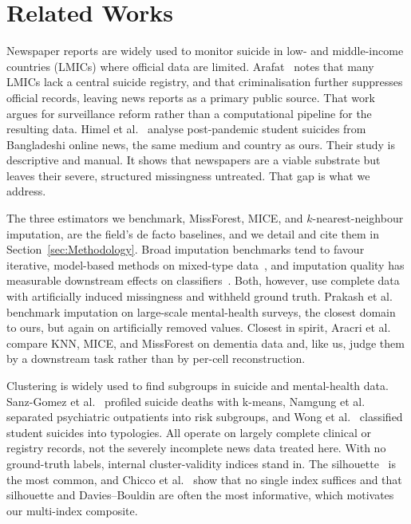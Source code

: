 \documentclass[conference]{IEEEtran}
\begin{document}
\section{Related Works}
\label{sec:related-works}

Newspaper reports are widely used to monitor suicide in low- and middle-income countries (LMICs) where official data are limited. Arafat~\cite{arafat2025surveillance} notes that many LMICs lack a central suicide registry, and that criminalisation further suppresses official records, leaving news reports as a primary public source. That work argues for surveillance reform rather than a computational pipeline for the resulting data. Himel et al.~\cite{himel2024studentnews} analyse post-pandemic student suicides from Bangladeshi online news, the same medium and country as ours. Their study is descriptive and manual. It shows that newspapers are a viable substrate but leaves their severe, structured missingness untreated. That gap is what we address.

The three estimators we benchmark, MissForest, MICE, and $k$-nearest-neighbour imputation, are the field's de facto baselines, and we detail and cite them in Section~\ref{sec:Methodology}. Broad imputation benchmarks tend to favour iterative, model-based methods on mixed-type data~\cite{jager2021benchmark}, and imputation quality has measurable downstream effects on classifiers~\cite{shadbahr2023imputationquality}. Both, however, use complete data with artificially induced missingness and withheld ground truth. Prakash et al.~\cite{prakash2025mentalhealthimpute} benchmark imputation on large-scale mental-health surveys, the closest domain to ours, but again on artificially removed values. Closest in spirit, Aracri et al.~\cite{aracri2025imputation} compare KNN, MICE, and MissForest on dementia data and, like us, judge them by a downstream task rather than by per-cell reconstruction.

Clustering is widely used to find subgroups in suicide and mental-health data. Sanz-Gomez et al.~\cite{sanzgomez2025impulsivity} profiled suicide deaths with k-means, Namgung et al.~\cite{namgung2024subgroups} separated psychiatric outpatients into risk subgroups, and Wong et al.~\cite{wong2022studentclusters} classified student suicides into typologies. All operate on largely complete clinical or registry records, not the severely incomplete news data treated here. With no ground-truth labels, internal cluster-validity indices stand in. The silhouette~\cite{rousseeuw1987silhouette} is the most common, and Chicco et al.~\cite{chicco2025silhouette} show that no single index suffices and that silhouette and Davies--Bouldin are often the most informative, which motivates our multi-index composite.
\end{document}
